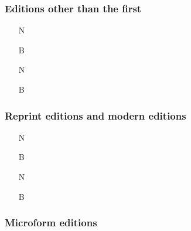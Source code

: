 \documentclass[11pt,letterpaper,oneside]{article}
\begin{document}
\setcounter{subsubsection}{117}
\subsubsection{Editions other than the first}

\begin{itemize}
\item[N] 

\item[B] 

\item[N] 

\item[B] 
\end{itemize}

\subsubsection{Reprint editions and modern editions}


\begin{itemize}


\item[N] 

\item[B] 

\item[N] 

\item[B] 
\end{itemize}

\subsubsection{Microform editions}
\label{14.120}

\end{document}
